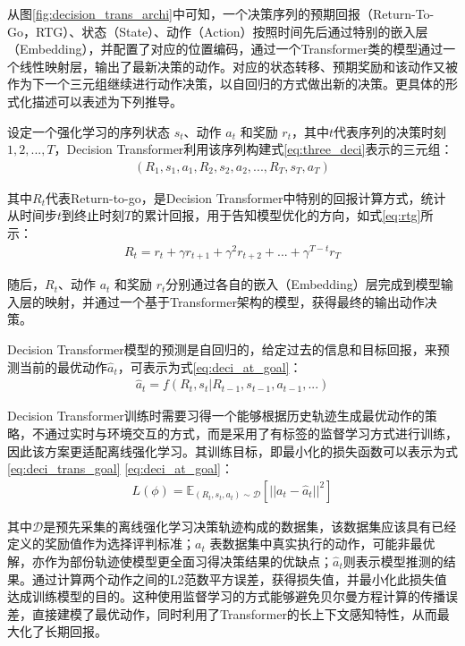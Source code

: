 从图\ref{fig:decision_trans_archi}中可知，一个决策序列的预期回报（Return-To-Go，RTG）、状态（State）、动作（Action）按照时间先后通过特别的嵌入层（Embedding），并配置了对应的位置编码，通过一个Transformer类的模型通过一个线性映射层，输出了最新决策的动作。对应的状态转移、预期奖励和该动作又被作为下一个三元组继续进行动作决策，以自回归的方式做出新的决策。更具体的形式化描述可以表述为下列推导。

设定一个强化学习的序列状态 $s_t$、动作 $a_t$ 和奖励 $r_t$，其中$t$代表序列的决策时刻$1,2,...,T$，Decision Transformer利用该序列构建式\eqref{eq:three_deci}表示的三元组：
\begin{equation}
\begin{aligned}
    (R_1,s_1,a_1,R_2,s_2,a_2,...,R_T,s_T,a_T)
\end{aligned}
\label{eq:three_deci}
\end{equation} 

其中$R_t$代表Return-to-go，是Decision Transformer中特别的回报计算方式，统计从时间步$t$到终止时刻$T$的累计回报，用于告知模型优化的方向，如式\eqref{eq:rtg}所示：
\begin{equation}
\begin{aligned}
    R_t = r_t + \gamma r_{t+1} + \gamma^2 r_{t+2} + ... + \gamma ^{T-t}r_{T}
\end{aligned}
\label{eq:rtg}
\end{equation} 

随后，$R_t$、动作 $a_t$ 和奖励 $r_t$分别通过各自的嵌入（Embedding）层完成到模型输入层的映射，并通过一个基于Transformer架构的模型，获得最终的输出动作决策。

Decision Transformer模型的预测是自回归的，给定过去的信息和目标回报，来预测当前的最优动作$\hat{a}_t$，可表示为式\eqref{eq:deci_at_goal}：
\begin{equation}
\begin{aligned}
    \hat{a}_t = f(R_t,s_t|R_{t-1},s_{t-1},a_{t-1},...)
\end{aligned}
\label{eq:deci_at_goal}
\end{equation} 


Decision Transformer训练时需要习得一个能够根据历史轨迹生成最优动作的策略，不通过实时与环境交互的方式，而是采用了有标签的监督学习方式进行训练，因此该方案更适配离线强化学习。其训练目标，即最小化的损失函数可以表示为式\eqref{eq:deci_trans_goal}
\eqref{eq:deci_at_goal}：
\begin{equation}
\begin{aligned}
    L(\phi) = \mathbb{E}_{(R_t,s_t,a_t) \sim \mathcal{D}}\left[||a_t-\hat{a}_t||^2\right]
\end{aligned}
\label{eq:deci_trans_goal}
\end{equation}

其中$\mathcal{D}$是预先采集的离线强化学习决策轨迹构成的数据集，该数据集应该具有已经定义的奖励值作为选择评判标准；$a_t$ 表数据集中真实执行的动作，可能非最优解，亦作为部份轨迹使模型更全面习得决策结果的优缺点；$\hat{a}_t$则表示模型推测的结果。通过计算两个动作之间的L2范数平方误差，获得损失值，并最小化此损失值达成训练模型的目的。这种使用监督学习的方式能够避免贝尔曼方程计算的传播误差，直接建模了最优动作，同时利用了Transformer的长上下文感知特性，从而最大化了长期回报。

